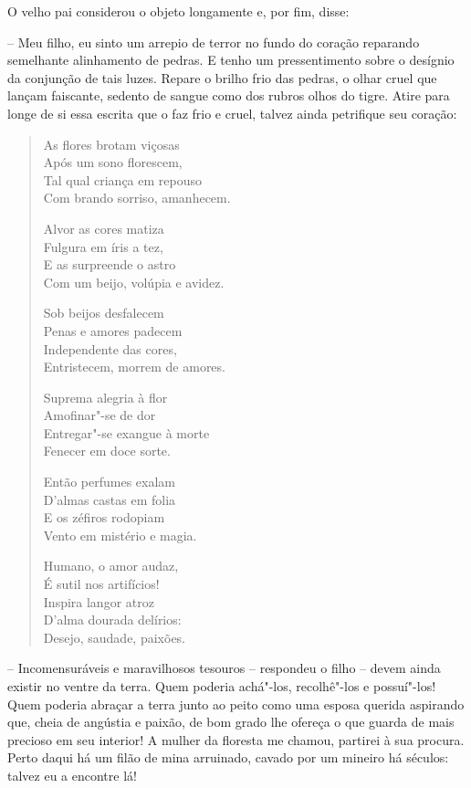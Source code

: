 O velho pai considerou o objeto longamente e, por fim, disse:

-- Meu filho, eu sinto um arrepio de terror no fundo do coração
reparando semelhante alinhamento de pedras. E tenho um pressentimento
sobre o desígnio da conjunção de tais luzes. Repare o brilho frio das
pedras, o olhar cruel que lançam faiscante, sedento de sangue como dos
rubros olhos do tigre. Atire para longe de si essa escrita que o faz
frio e cruel, talvez ainda petrifique seu coração:

\begin{verse}
As flores brotam viçosas\\
Após um sono florescem,\\
Tal qual criança em repouso\\
Com brando sorriso, amanhecem.

Alvor as cores matiza\\
Fulgura em íris a tez,\\
E as surpreende o astro\\
Com um beijo, volúpia e avidez. 

Sob beijos desfalecem\\
Penas e amores padecem\\
Independente das cores,\\
Entristecem, morrem de amores.

Suprema alegria à flor\\
Amofinar"-se de dor\\
Entregar"-se exangue à morte\\
Fenecer em doce sorte. 

Então perfumes exalam\\
D'almas castas em folia\\
E os zéfiros rodopiam\\
Vento em mistério e magia.

Humano, o amor audaz,\\
É sutil nos artifícios!\\ 
Inspira langor atroz\\
D'alma dourada delírios:\\
Desejo, saudade, paixões.
\end{verse}

-- Incomensuráveis e maravilhosos tesouros -- respondeu o filho -- devem
ainda existir no ventre da terra. Quem poderia achá"-los, recolhê"-los e
possuí"-los! Quem poderia abraçar a terra junto ao peito como uma esposa
querida aspirando que, cheia de angústia e paixão, de bom grado lhe
ofereça o que guarda de mais precioso em seu interior! A mulher da
floresta me chamou, partirei à sua procura. Perto daqui há um filão de
mina arruinado, cavado por um mineiro há séculos: talvez eu a encontre lá!

